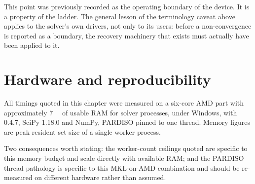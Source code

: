 \begin{caveat}
This point was previously recorded as the operating boundary of the device. It
is a property of the ladder. The general lesson of the terminology caveat above
applies to the solver's own drivers, not only to its users: before a
non-convergence is reported as a boundary, the recovery machinery that exists
must actually have been applied to it.
\end{caveat}

\section{Hardware and reproducibility}
\label{sec:hardware}

All timings quoted in this chapter were measured on a six-core AMD part with
approximately \SI{7}{\giga\byte} of usable RAM for solver processes, under
Windows, with  0.4.7, SciPy 1.18.0 and NumPy, PARDISO pinned to
one thread. Memory figures are peak resident set size of a single worker
process.

Two consequences worth stating: the worker-count ceilings quoted are specific to
this memory budget and scale directly with available RAM; and the PARDISO thread
pathology is specific to this MKL-on-AMD combination and should be re-measured
on different hardware rather than assumed.
